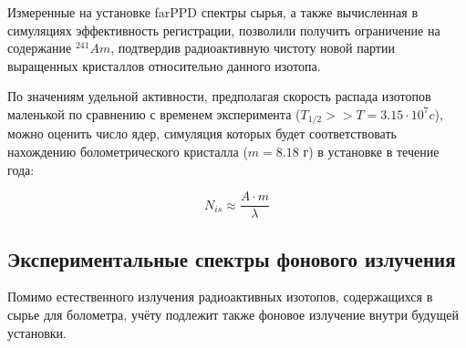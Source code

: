 \documentclass[a4paper,article,14pt]{extarticle}
\begin{document}
Измеренные на установке farPPD спектры сырья, а также вычисленная в симуляциях эффективность регистрации, позволили получить ограничение на содержание $^{241}Am$, подтвердив радиоактивную чистоту новой партии выращенных кристаллов относительно данного изотопа.

По значениям удельной активности, предполагая скорость распада изотопов маленькой по сравнению с временем эксперимента ($T_{1/2} >> T = 3.15 \cdot {10^7} c$), можно оценить число ядер, симуляция которых будет соответствовать нахождению болометрического кристалла ($m= 8.18 \text{ г}$) в установке в течение года:

\begin{equation}
    N_{is} \approx \frac{A \cdot m }{\lambda} 
\end{equation}

\begin{table}[]
\centering
\caption{Активность нуклидов в образце и полное число событий за год, соответствующее данной активности}
\label{sources}
\end{table}
    
\subsection{Экспериментальные спектры фонового излучения}
    Помимо естественного излучения радиоактивных изотопов, содержащихся в сырье для болометра, учёту подлежит также фоновое излучение внутри будущей установки.
    
\end{document}
